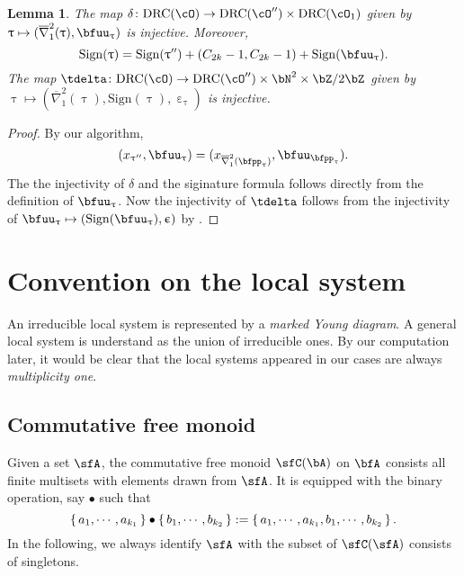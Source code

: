 \documentclass[12pt,a4paper]{amsart}
\def\eDDo{\overline{\nabla}_1}
\numberwithin{equation}{section}
\newtheorem{lem}[thm]{Lemma}
\theoremstyle{remark}
\def\ssign{\mathrm{Sign}}
\def\drc{\mathrm{DRC}}
\def\cOpp{\cO^{\prime\prime}}
\def\uptaupp{\uptau^{\prime\prime}}
\begin{document}
\begin{lem}\label{lem:gd.inj}
  The map $\delta\colon  \drc(\cO)\rightarrow \drc(\cOpp) \times \drc(\cO_{1})$
  given by $\uptau\mapsto (\eDDo^{2}(\uptau),\bfuu_{\uptau})$ is injective.
  Moreover,
  \[
  \ssign(\uptau) =\ssign(\uptaupp) + (C_{2k}-1, C_{2k}-1)+\ssign(\bfuu_{\uptau}).
  \]
  The map $\tdelta\colon \drc(\cO)\rightarrow \drc(\cOpp) \times \bN^{2}\times \bZ/2\bZ$
  given by $\uptau\mapsto (\eDDo^{2}(\uptau), \ssign(\uptau),\upepsilon_{\uptau})$ is injective.
\end{lem}
\begin{proof}
  By our algorithm,
  \[
    (x_{\uptaupp},\bfuu_{\uptau}) = (x_{\eDDo^{2}(\bfpp_{\uptau})}, \bfuu_{\bfpp_{\uptau}}).
  \]
  The the injectivity of $\delta$ and the siginature formula follows directly
  from the definition of $\bfuu_{\uptau}$.
  Now the injectivity of $\tdelta$ follows from the injectivity of
  $\bfuu_{\uptau}\mapsto (\ssign(\bfuu_{\uptau}), \upepsilon)$ by
  .
\end{proof}



\section{Convention on the local system}
An irreducible local system is represented by a {\emph{marked Young
    diagram}}. A general local system is understand as the
union of irreducible ones. By our computation later, it would be clear that the
local systems appeared in our cases are always \emph{multiplicity one}.


\subsection{Commutative free monoid}
Given a  set $\sfA$, the commutative free monoid $\sfC(\bA)$ on $\bfA$ consists all finite multisets with
elements drawn from $\sfA$.
It is equipped with the binary operation, say $\bullet$ such that
\[
  \set{a_{1},\cdots, a_{k_{1}}}\bullet \set{b_{1},\cdots, b_{k_{2}}} :=
  \set{a_{1},\cdots, a_{k_{1}},b_{1},\cdots, b_{k_{2}}}.
\]
In the following, we always identify $\sfA$ with the subset of $\sfC(\sfA)$
consists of singletons.
\end{document}
